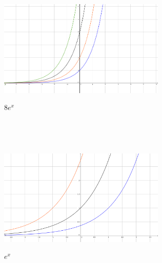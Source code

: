 \documentclass[a4paper]{article} %
\begin{document}
		\begin{minipage}{0.3\textwidth}
		\begin{figure}[H]
		\includegraphics[width=300px, height=200px]{E_2.png}
			\captionsetup{labelformat=empty}
				\centering
				\caption{$e^x$}
				\vspace{-0,3 cm}
				\caption{$2e^x$}
				\vspace{-0,3 cm}
				\caption{$4e^{x}$}
				\vspace{-0,3 cm}
				\caption{$8e^{x}$}
		\end{figure}
		\end{minipage} \hfill
		\\\\
		\begin{minipage}{0.3\textwidth}
		\begin{figure}[H]
		\includegraphics[width=300px, height=200px]{E_3.png}
			\captionsetup{labelformat=empty}
				\centering
				\caption{$e^{x-1}$}
				\vspace{-0,3 cm}
				\caption{$e^{x+1}$}
				\vspace{-0,3 cm}
				\caption{$e^{x}$}
		\end{figure}
		\end{minipage} \hfill
		\\\\
\end{document}
